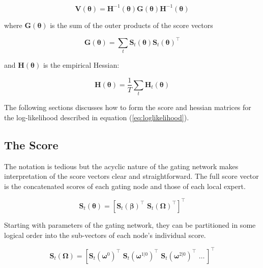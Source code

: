 \documentclass[12pt]{article}
\newcommand{\Ht}[1]{\mathbf{H}_{t}(#1)}
\newcommand{\HH}[1]{\boldsymbol{H}(#1)}
\newcommand{\HI}[1]{\boldsymbol{H}^{-1}(#1)}
\begin{document}
\begin{equation} \label{eq:robustgatevarcov}
  \boldsymbol{V}(\boldsymbol{\theta}) = \HI{\boldsymbol{\theta}} \boldsymbol{G}(\boldsymbol{\theta}) \HI{\boldsymbol{\theta}}
\end{equation}



where $\boldsymbol{G}(\boldsymbol{\theta})$ is the sum of the outer products of the score 
vectors

\begin{equation}
  \boldsymbol{G}(\boldsymbol{\theta}) = \sum_{t} \boldsymbol{S}_{t}(\boldsymbol{\theta}) \boldsymbol{S}_{t}(\boldsymbol{\theta})^\top
\end{equation}

and $\HH{\boldsymbol{\theta}}$ is the empirical Hessian:

\begin{equation}
  \HH{\boldsymbol{\theta}} = \frac{1}{T} \sum_{t} \Ht{\boldsymbol{\theta}}
\end{equation}

The following sections discusses how to form the score and hessian matrices 
for the log-likelihood described in equation (\ref{eq:loglikelihood}).

\subsection{The Score} \label{sec:TheScore}

The notation is tedious but the acyclic nature of the
gating network makes interpretation of the score vectors clear and
straightforward. The full score vector is the concatenated scores  
of each gating node and those of each local expert.

\begin{equation}
  \boldsymbol{S}_{t}(\boldsymbol{\theta}) = [ \boldsymbol{S}_{t}(\boldsymbol{\beta})^{\top} \,\, \boldsymbol{S}_{t}(\boldsymbol{\Omega})^{\top} ]^{\top}
\end{equation}

Starting with
parameters of the gating network, they can be partitioned 
in some logical order into the sub-vectors of each node's individual
score.

\begin{equation}
  \boldsymbol{S}_{t}(\boldsymbol{\Omega}) = [ \boldsymbol{S}_{t}(\boldsymbol{\omega}^{0})^{\top} \,\, \boldsymbol{S}_{t}(\boldsymbol{\omega}^{1 | 0})^{\top} \,\, \boldsymbol{S}_{t}(\boldsymbol{\omega}^{2 | 0})^{\top} \,\, \ldots \, ]^{\top}
\end{equation}
\end{document}
